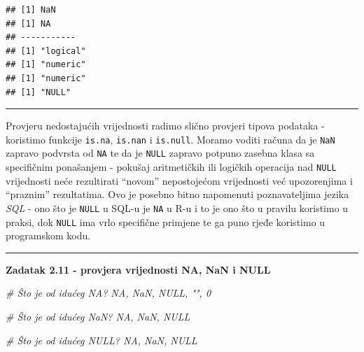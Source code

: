 \documentclass[]{book}
\newenvironment{Shaded}{\begin{snugshade}}{\end{snugshade}}
\newcommand{\CommentTok}[1]{\textcolor[rgb]{0.56,0.35,0.01}{\textit{#1}}}
\theoremstyle{definition}
\theoremstyle{definition}
\theoremstyle{definition}
\theoremstyle{remark}
\begin{document}
\begin{verbatim}
## [1] NaN
## [1] NA
## -----------
## [1] "logical"
## [1] "numeric"
## [1] "numeric"
## [1] "NULL"
\end{verbatim}

\begin{center}\rule{0.5\linewidth}{\linethickness}\end{center}

Provjeru nedostajućih vrijednosti radimo slično provjeri tipova podataka
- koristimo funkcije \texttt{is.na}, \texttt{is.nan} i \texttt{is.null}.
Moramo voditi računa da je \texttt{NaN} zapravo podvrsta od \texttt{NA}
te da je \texttt{NULL} zapravo potpuno zasebna klasa sa specifičnim
ponašanjem - pokušaj aritmetičkih ili logičkih operacija nad
\texttt{NULL} vrijednosti neće rezultirati ``novom'' nepostojećom
vrijednosti već upozorenjima i ``praznim'' rezultatima. Ovo je posebno
bitno napomenuti poznavateljima jezika \emph{SQL} - ono što je
\texttt{NULL} u SQL-u je \texttt{NA} u R-u i to je ono što u pravilu
koristimo u praksi, dok \texttt{NULL} ima vrlo specifične primjene te ga
puno rjeđe koristimo u programskom kodu.

\begin{center}\rule{0.5\linewidth}{\linethickness}\end{center}

\textbf{Zadatak 2.11 - provjera vrijednosti NA, NaN i NULL}

\begin{Shaded}
\begin{Highlighting}[]
\CommentTok{# Što je od idućeg NA?      NA, NaN, NULL, "", 0}

\CommentTok{# Što je od idućeg NaN?     NA, NaN, NULL}

\CommentTok{# Što je od idućeg NULL?    NA, NaN, NULL}
\end{Highlighting}
\end{Shaded}
\end{document}
